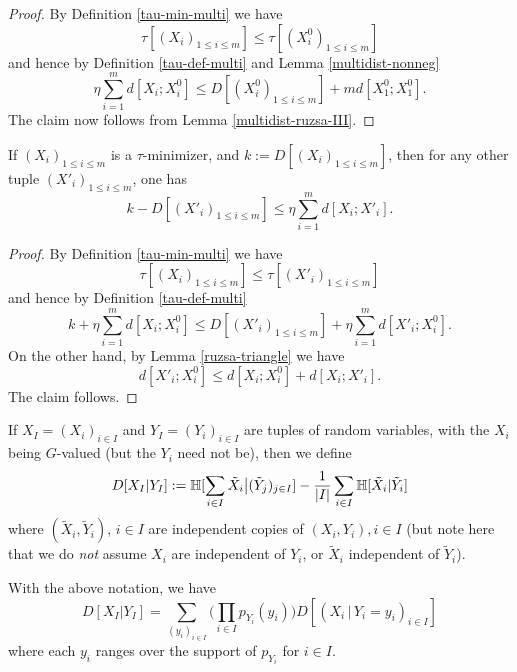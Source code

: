 \begin{proof}  By Definition \ref{tau-min-multi} we have
  $$ \tau[ (X_i)_{1 \leq i \leq m}] \leq \tau[ (X^0_i)_{1 \leq i \leq m}]$$
and hence by Definition \ref{tau-def-multi} and Lemma \ref{multidist-nonneg}
$$ \eta \sum_{i=1}^m d[X_i; X^0_i] \leq D[(X^0_i)_{1 \leq i \leq m}] + m d[X^0_1; X^0_1].$$
The claim now follows from Lemma \ref{multidist-ruzsa-III}.
\end{proof}

\begin{lemma}\label{multidist-lower}  If  $(X_i)_{1 \leq i \leq m}$ is a $\tau$-minimizer, and $k := D[(X_i)_{1 \leq i \leq m}]$, then for any other tuple $(X'_i)_{1 \leq i \leq m}$, one has
  $$ k - D[(X'_i)_{1 \leq i \leq m}] \leq \eta \sum_{i=1}^m d[X_i; X'_i].$$
\end{lemma}

\begin{proof}
  By Definition \ref{tau-min-multi} we have
  $$ \tau[ (X_i)_{1 \leq i \leq m}] \leq \tau[ (X'_i)_{1 \leq i \leq m}]$$
  and hence by Definition \ref{tau-def-multi}
  $$ k + \eta \sum_{i=1}^m d[X_i; X^0_i] \leq D[(X'_i)_{1 \leq i \leq m}] + \eta \sum_{i=1}^m d[X'_i; X^0_i].$$
  On the other hand, by Lemma \ref{ruzsa-triangle} we have
  $$ d[X'_i; X^0_i] \leq d[X_i; X^0_i] + d[X_i; X'_i].$$
  The claim follows.
\end{proof}

\begin{definition}\label{cond-multidist-def} If $X_I = (X_i)_{i \in I}$ and $Y_I = (Y_i)_{i \in I}$ are tuples of random variables, with the $X_i$ being $G$-valued (but the $Y_i$ need not be), then we define
  \begin{equation}\label{multi-def-cond}
  D[ X_{I} | Y_{I}] := \mathbb{H}[\sum_{i \in I} \tilde X_i \big| (\tilde Y_j)_{j \in I} ] - \frac{1}{|I|} \sum_{i \in I} \mathbb{H}[ \tilde X_i | \tilde Y_i]
    \end{equation}
  where $(\tilde X_i,\tilde Y_i)$, $i \in I$ are independent copies of $(X_i,Y_i), i \in I$ (but note here that we do \emph{not} assume $X_i$ are independent of $Y_i$, or $\tilde X_i$ independent of $\tilde Y_i$).
\end{definition}

\begin{lemma}\label{cond-multidist-alt}  With the above notation, we have
  \begin{equation}\label{multi-def-cond-alt}
    D[ X_{I} | Y_{I} ] = \sum_{(y_i)_{i \in I}} \biggl(\prod_{i \in I} p_{Y_i}(y_i)\biggr) D[ (X_i \,|\, Y_i \mathop{=}y_i)_{i \in I}]
  \end{equation}
  where each $y_i$ ranges over the support of $p_{Y_i}$ for $i \in I$.
\end{lemma}


